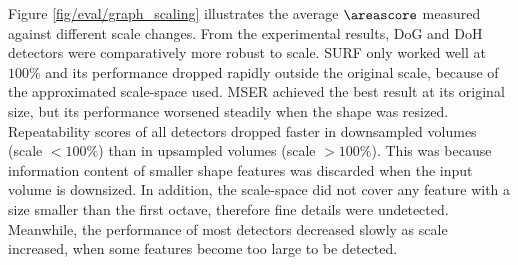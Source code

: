 Figure \ref{fig/eval/graph_scaling} illustrates the average $\areascore$ measured against different scale changes. 
From the experimental results, DoG and DoH detectors were comparatively more robust to scale. SURF only worked well at $100\%$ and its performance dropped rapidly outside the original scale, because of the approximated scale-space used. MSER achieved the best result at its original size, but its performance worsened steadily when the shape was resized.
Repeatability scores of all detectors dropped faster in downsampled volumes (scale $< 100\%$) than in upsampled volumes (scale $> 100\%$). 
This was because information content of smaller shape features was discarded when the input volume is downsized.   
In addition, the scale-space did not cover any feature with a size smaller than the first octave, therefore fine details were undetected.  
Meanwhile, the performance of most detectors decreased slowly as scale increased, when some features become too large to be detected. 
